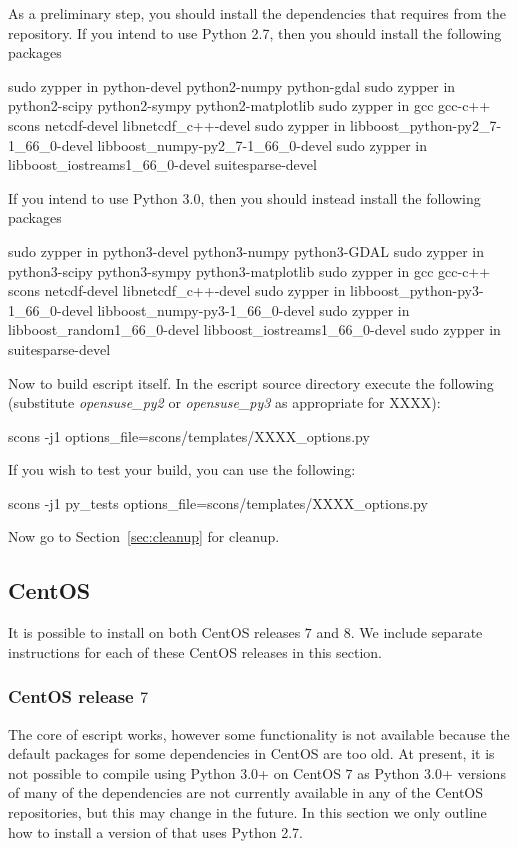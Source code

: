 \noindent As a preliminary step, you should install the dependencies that \esfinley requires from the repository.
\noindent  If you intend to use Python 2.7, then you should install the following packages
\begin{shellCode}
sudo zypper in python-devel python2-numpy python-gdal
sudo zypper in python2-scipy python2-sympy python2-matplotlib
sudo zypper in gcc gcc-c++ scons netcdf-devel libnetcdf_c++-devel
sudo zypper in libboost_python-py2_7-1_66_0-devel libboost_numpy-py2_7-1_66_0-devel
sudo zypper in libboost_iostreams1_66_0-devel suitesparse-devel
\end{shellCode}

\noindent If you intend to use Python 3.0, then you should instead install the following packages
\begin{shellCode}
sudo zypper in python3-devel python3-numpy python3-GDAL
sudo zypper in python3-scipy python3-sympy python3-matplotlib
sudo zypper in gcc gcc-c++ scons netcdf-devel libnetcdf_c++-devel
sudo zypper in libboost_python-py3-1_66_0-devel libboost_numpy-py3-1_66_0-devel
sudo zypper in libboost_random1_66_0-devel libboost_iostreams1_66_0-devel
sudo zypper in suitesparse-devel
\end{shellCode}

\noindent Now to build escript itself.
\noindent In the escript source directory execute the following (substitute \textit{opensuse_py2} or \textit{opensuse_py3} as appropriate for XXXX):
\begin{shellCode}
scons -j1 options_file=scons/templates/XXXX_options.py
\end{shellCode}

\noindent If you wish to test your build, you can use the following:
\begin{shellCode}
scons -j1 py_tests options_file=scons/templates/XXXX_options.py
\end{shellCode}

\noindent Now go to Section~\ref{sec:cleanup} for cleanup.

\subsection{CentOS}\label{sec:centossrc}
It is possible to install \escript on both CentOS releases $7$ and $8$. We include separate instructions for each of these CentOS releases in this section.
\subsubsection{CentOS release $7$}
The core of escript works, however some functionality is not available because the default packages for some dependencies in CentOS are too old.
At present, it is not possible to compile \escript using Python 3.0+ on CentOS $7$ as Python 3.0+ versions of many of the dependencies are not currently available in any of the CentOS repositories, but this may change in the future. 
In this section we only outline how to install a version of \escript that uses Python 2.7.

